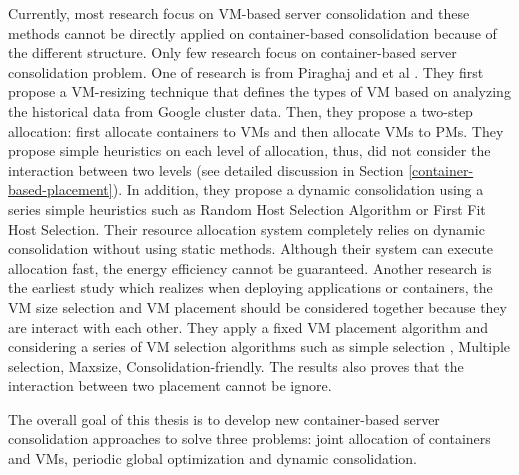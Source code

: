 Currently, most research focus on VM-based server consolidation and these methods cannot be directly applied on container-based consolidation because of the different structure. Only few research focus on container-based server consolidation problem. One of  research is from Piraghaj and et al \cite{Piraghaj:2015uf}. They first propose a VM-resizing technique that defines the types of VM based on analyzing the historical data from Google cluster data. Then, they propose a two-step allocation: first allocate containers to VMs and then allocate VMs to PMs. They propose simple heuristics on each level of allocation, thus, did not consider the interaction between two levels (see detailed discussion in Section \ref{container-based-placement}). In addition, they propose a dynamic consolidation \cite{Piraghaj:2016bw} using a series simple heuristics such as Random Host Selection Algorithm or First Fit Host Selection. 
Their resource allocation system completely relies on dynamic consolidation without using static methods. Although their system can execute allocation fast, the energy efficiency cannot be guaranteed. Another research  \cite{Mann:2016hx} is the earliest study which realizes when deploying applications or containers, the VM size selection and VM placement should be considered together because they are interact with each other. They apply a fixed VM placement algorithm and considering a series of VM selection algorithms such as simple selection \cite{Ganesan:2012eb},  Multiple selection, Maxsize, Consolidation-friendly. The results also proves that the interaction between two placement cannot be ignore.




The overall goal of this thesis is to develop new container-based server consolidation approaches to solve three problems: joint allocation of containers  and VMs, periodic global optimization and dynamic consolidation. 
